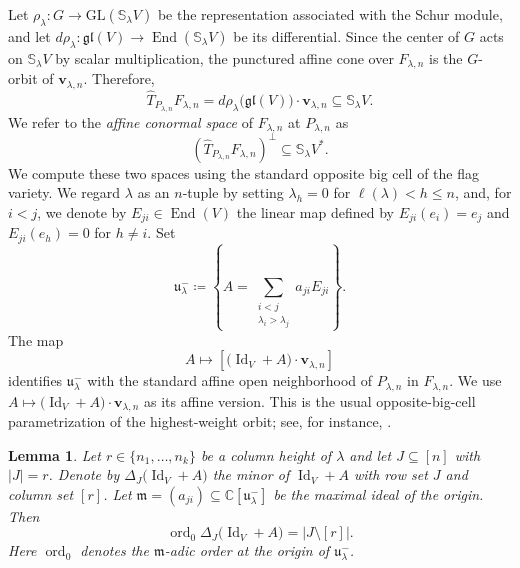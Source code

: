 \documentclass[a4paper,reqno]{amsart}
\theoremstyle{plainnopunct}
\newtheorem{lemma}[lemma]{Lemma}
\theoremstyle{definitionnopunct}
\newcommand{\C}{\mathbb{C}}
\renewcommand{\S}{\mathbb{S}}
\newcommand{\GL}{\mathrm{GL}}
\newcommand{\Lie}{\mathfrak}
\newcommand{\bv}{\mathbf{v}}
\begin{document}
Let $\rho_\lambda: G \rightarrow \GL(\S_\lambda V)$ be the representation associated with the Schur module, and let $d\rho_\lambda: \Lie{gl}(V) \rightarrow \operatorname{End}(\S_\lambda V)$ be its differential.
Since the center of $G$ acts on $\S_\lambda V$ by scalar multiplication, the punctured affine cone over $F_{\lambda,n}$ is the $G$-orbit of $\bv_{\lambda,n}$. Therefore,
\begin{equation}
\label{eq: tangent via action}
\widehat{T}_{P_{\lambda,n}}F_{\lambda,n}
=
d\rho_\lambda\bigl(\Lie{gl}(V)\bigr)
\cdot
\bv_{\lambda,n}
\subseteq
\S_\lambda V.
\end{equation}
We refer to the \emph{affine conormal space} of $F_{\lambda,n}$ at $P_{\lambda,n}$ as
\[
\left(
\widehat{T}_{P_{\lambda,n}}F_{\lambda,n}
\right)^\perp
\subseteq
\S_\lambda V^*.
\]
We compute these two spaces using the standard opposite big cell of the flag variety. We regard $\lambda$ as an $n$-tuple by setting $\lambda_h=0$ for $\ell(\lambda)<h\leq n$, and, for $i<j$, we denote by $E_{ji}\in\operatorname{End}(V)$ the linear map defined by $E_{ji}(e_i)=e_j$ and $E_{ji}(e_h)=0$ for $h\neq i$.
Set
\[\mathfrak u^-_\lambda
\coloneq
\left\{
A=
\sum_{\substack{i<j\\ \lambda_i>\lambda_j}}
a_{ji}E_{ji}
\right\}.
\]The map
\[
A
\longmapsto
\left[
\bigl(\operatorname{Id}_V+A\bigr)\cdot\bv_{\lambda,n}
\right]
\]
identifies $\mathfrak u^-_\lambda$ with the standard affine open neighborhood of $P_{\lambda,n}$ in $F_{\lambda,n}$. We use $A
\mapsto
\bigl(\operatorname{Id}_V+A\bigr)\cdot\bv_{\lambda,n}$ as its affine version. This is the usual opposite-big-cell parametrization of the highest-weight orbit; see, for instance, \cite{Fulton1997,FultonHarris1991}.

\begin{lemma}
\label{lem: minor vanishing order}
Let $r\in\{n_1,\ldots,n_k\}$ be a column height of $\lambda$ and let $J\subseteq[n]$ with $|J|=r$. Denote by $\Delta_J\bigl(\operatorname{Id}_V+A\bigr)$ the minor of $\operatorname{Id}_V+A$ with row set $J$ and column set $[r]$. Let $\mathfrak m = (a_{ji}) \subseteq \C[\mathfrak u^-_\lambda]$ be the maximal ideal of the origin. Then
\[\operatorname{ord}_0
\Delta_J\bigl(\operatorname{Id}_V+A\bigr)
=
|J\setminus[r]|.
\]Here $\operatorname{ord}_0$ denotes the $\mathfrak m$-adic order at the origin of $\mathfrak u^-_\lambda$.
\end{lemma}
\end{document}
